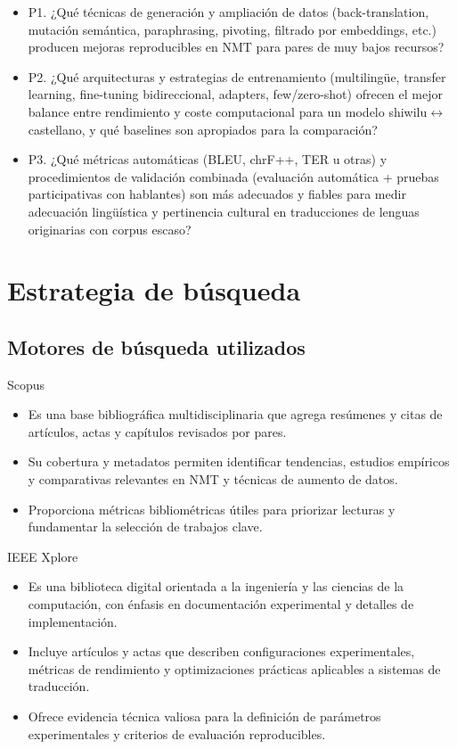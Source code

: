\documentclass[12pt,a4paper,oneside]{book}
\begin{document}
\begin{itemize}
\item
  P1. ¿Qué técnicas de generación y ampliación de datos (back-translation, mutación semántica, paraphrasing, pivoting, filtrado por embeddings, etc.) producen mejoras reproducibles en NMT para pares de muy bajos recursos?
\item
  P2. ¿Qué arquitecturas y estrategias de entrenamiento (multilingüe, transfer learning, fine-tuning bidireccional, adapters, few/zero-shot) ofrecen el mejor balance entre rendimiento y coste computacional para un modelo shiwilu$\leftrightarrow$castellano, y qué baselines son apropiados para la comparación?
\item
  P3. ¿Qué métricas automáticas (BLEU, chrF++, TER u otras) y procedimientos de validación combinada (evaluación automática + pruebas participativas con hablantes) son más adecuados y fiables para medir adecuación lingüística y pertinencia cultural en traducciones de lenguas originarias con corpus escaso?
\end{itemize}

\section{Estrategia de búsqueda}\label{estrategia-de-buxfasqueda}

\subsection{Motores de búsqueda utilizados}\label{motores-de-buxfasqueda-a-usar}

Scopus

\begin{itemize}
\item
  Es una base bibliográfica multidisciplinaria que agrega resúmenes y citas de artículos, actas y capítulos revisados por pares.
\item
  Su cobertura y metadatos permiten identificar tendencias, estudios empíricos y comparativas relevantes en NMT y técnicas de aumento de datos.
\item
  Proporciona métricas bibliométricas útiles para priorizar lecturas y fundamentar la selección de trabajos clave.
\end{itemize}

IEEE Xplore

\begin{itemize}
\item
  Es una biblioteca digital orientada a la ingeniería y las ciencias de la computación, con énfasis en documentación experimental y detalles de implementación.
\item
  Incluye artículos y actas que describen configuraciones experimentales, métricas de rendimiento y optimizaciones prácticas aplicables a sistemas de traducción.
\item
  Ofrece evidencia técnica valiosa para la definición de parámetros experimentales y criterios de evaluación reproducibles.
\end{itemize}
\end{document}
